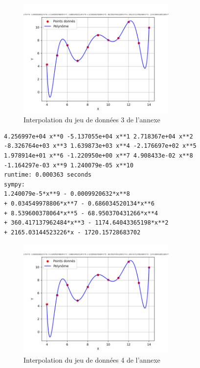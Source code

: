 \begin{figure}[h]
    \centering
    \includegraphics[width=0.7\textwidth]{sources/max/res43.-fig.png}
    \caption{Interpolation du jeu de données 3 de l'annexe}
\end{figure}
\newpage
\begin{lstlisting}[caption=res44.err ,basicstyle=\fontsize{8}{10}\selectfont]
4.256997e+04 x**0 -5.137055e+04 x**1 2.718367e+04 x**2 
-8.326764e+03 x**3 1.639873e+03 x**4 -2.176697e+02 x**5 
1.978914e+01 x**6 -1.220950e+00 x**7 4.908433e-02 x**8 
-1.164297e-03 x**9 1.240079e-05 x**10 
runtime: 0.000363 seconds
sympy:
1.240079e-5*x**9 - 0.0009920632*x**8 
+ 0.034549978806*x**7 - 0.686034520134*x**6 
+ 8.539600378064*x**5 - 68.950370431266*x**4 
+ 360.417137962484*x**3 - 1174.64043365198*x**2 
+ 2165.03144523226*x - 1720.15728683702
\end{lstlisting}
\begin{figure}[h]
    \centering
    \includegraphics[width=0.7\textwidth]{sources/max/res44.-fig.png}
    \caption{Interpolation du jeu de données 4 de l'annexe}
\end{figure}